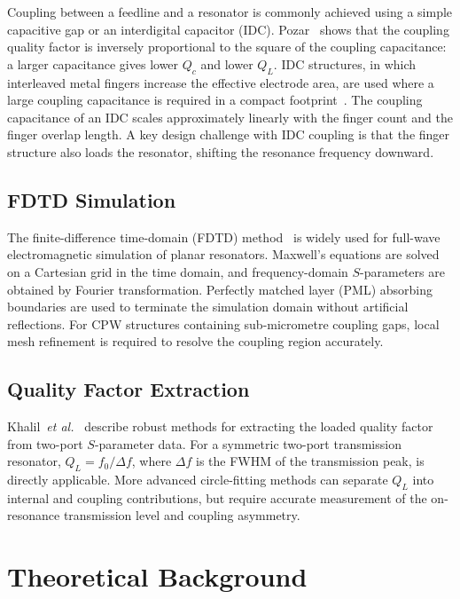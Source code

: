 \documentclass[12pt,a4paper]{article}
\begin{document}
Coupling between a feedline and a resonator is commonly achieved using a
simple capacitive gap or an interdigital capacitor (IDC). Pozar~\cite{Pozar2011}
shows that the coupling quality factor is inversely proportional to the
square of the coupling capacitance: a larger capacitance gives lower
$Q_c$ and lower $Q_L$. IDC structures, in which interleaved metal fingers
increase the effective electrode area, are used where a large coupling
capacitance is required in a compact footprint~\cite{Simons2001}. The
coupling capacitance of an IDC scales approximately linearly with the
finger count and the finger overlap length. A key design challenge with
IDC coupling is that the finger structure also loads the resonator,
shifting the resonance frequency downward.

\subsection{FDTD Simulation}

The finite-difference time-domain (FDTD) method~\cite{Taflove2005} is
widely used for full-wave electromagnetic simulation of planar resonators.
Maxwell's equations are solved on a Cartesian grid in the time domain, and
frequency-domain $S$-parameters are obtained by Fourier transformation.
Perfectly matched layer (PML) absorbing boundaries are used to terminate
the simulation domain without artificial reflections. For CPW structures
containing sub-micrometre coupling gaps, local mesh refinement is required
to resolve the coupling region accurately.

\subsection{Quality Factor Extraction}

Khalil~\textit{et al.}~\cite{Khalil2012} describe robust methods for
extracting the loaded quality factor from two-port $S$-parameter data.
For a symmetric two-port transmission resonator, $Q_L = f_0/\Delta f$,
where $\Delta f$ is the FWHM of the transmission peak, is directly
applicable. More advanced circle-fitting methods can separate $Q_L$ into
internal and coupling contributions, but require accurate measurement of
the on-resonance transmission level and coupling asymmetry.

\newpage
\section{Theoretical Background}
\label{sec:theory}
\end{document}
